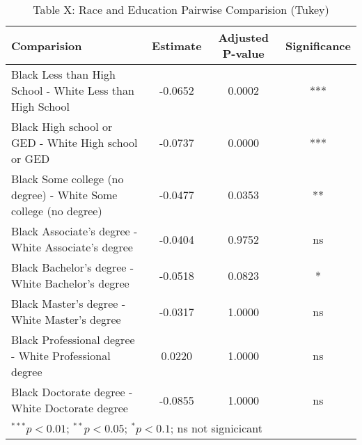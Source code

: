 \documentclass{article}
\begin{document}
\begin{table}[ht]
\centering
\caption*{Table X: Race and Education Pairwise Comparision (Tukey)}
\begin{tabular}{lccc}
  \hline
 Comparision & Estimate & Adjusted P-value & Significance \\ 
  \hline
Black Less than High School - White Less than High School & -0.0652 & 0.0002 & *** \\ 
  Black High school or GED - White High school or GED & -0.0737 & 0.0000 & *** \\ 
  Black Some college (no degree) - White Some college (no degree) & -0.0477 & 0.0353 & ** \\ 
  Black Associate's degree - White Associate's degree & -0.0404 & 0.9752 & ns \\ 
  Black Bachelor's degree - White Bachelor's degree & -0.0518 & 0.0823 & * \\ 
  Black Master's degree - White Master's degree & -0.0317 & 1.0000 & ns \\ 
  Black Professional degree - White Professional degree & 0.0220 & 1.0000 & ns \\ 
  Black Doctorate degree - White Doctorate degree & -0.0855 & 1.0000 & ns \\ 
   \hline
   \multicolumn{4}{l}{\scriptsize{$^{***}p<0.01$; $^{**}p<0.05$; $^{*}p<0.1$; ns not signicicant}}
\end{tabular}
\end{table}
\end{document}

